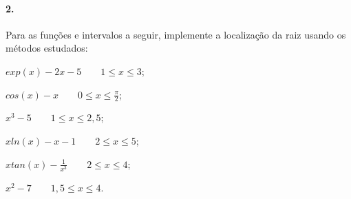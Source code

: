 \paragraph{2.} Para as funções e intervalos a seguir, implemente a localização da raiz
usando os métodos estudados:

\begin{enumerate}[a)]
	\begin{minipage}{0.5\textwidth}
	\item $exp(x) -2x -5\qquad 1\leq x\leq 3$;
	\item $cos(x)-x\qquad 0\leq x\leq\frac{\pi}{2}$; 
	\item $x^3-5\qquad 1\leq x \leq 2,5$;
	\end{minipage}
	\begin{minipage}{0.5\textwidth}
	\item $xln(x)-x-1\qquad 2\leq x\leq 5 $;
	\item $xtan(x)-\frac{1}{x^3}\qquad 2\leq x\leq 4$;
	\item $x^2-7\qquad 1,5\leq x\leq 4$.
	\end{minipage}
\end{enumerate}
